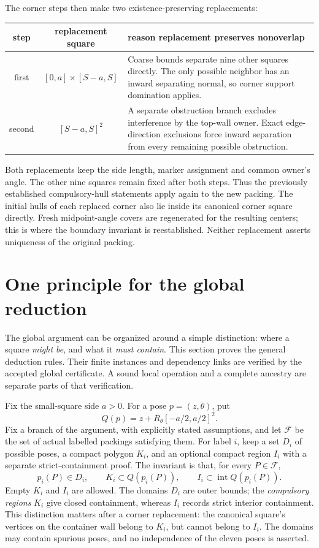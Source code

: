 \documentclass[11pt]{article}
\begin{document}
The corner steps then make two existence-preserving replacements:
\begin{center}
\begin{tabular}{c|c|p{.49\linewidth}}
step&replacement square&reason replacement preserves nonoverlap\\ \hline
first&$[0,a]\times[S-a,S]$&
Coarse bounds separate nine other squares directly. The only possible
neighbor has an inward separating normal, so corner support domination
applies.\\
second&$[S-a,S]^2$&
A separate obstruction branch excludes interference by the top-wall
owner. Exact edge-direction exclusions force inward separation from
every remaining possible obstruction.
\end{tabular}
\end{center}
Both replacements keep the side length, marker assignment and common
owner's angle. The other nine squares remain fixed after both steps.
Thus the previously established compulsory-hull statements apply again
to the new packing. The initial hulls of each replaced corner also lie
inside its canonical corner square directly. Fresh midpoint-angle covers
are regenerated for the resulting centers; this is where the boundary
invariant is reestablished. Neither replacement asserts uniqueness of the
original packing.


\section{One principle for the global reduction}
\label{sec:global-envelope}

The global argument can be organized around a simple distinction: where a
square \emph{might be}, and what it \emph{must contain}.  This section proves
the general deduction rules. Their finite instances and dependency links
are verified by the accepted global certificate. A sound local operation
and a complete ancestry are separate parts of that verification.

Fix the small-square side $a>0$.  For a pose $p=(z,\theta)$, put
\[
 Q(p)=z+R_\theta[-a/2,a/2]^2.
\]
Fix a branch of the argument, with explicitly stated assumptions, and let
$\mathcal F$ be the set of actual labelled packings satisfying them.
For label $i$, keep a set $D_i$ of possible poses, a compact polygon $K_i$,
and an optional compact region $I_i$ with a separate strict-containment proof.
The invariant is that, for every $P\in\mathcal F$,
\begin{equation}
 p_i(P)\in D_i,
 \qquad K_i\subset Q(p_i(P)),
 \qquad I_i\subset\operatorname{int}Q(p_i(P)).
 \tag{G}\label{eq:global-invariant}
\end{equation}
Empty $K_i$ and $I_i$ are allowed.  The domains $D_i$ are outer bounds;
the \emph{compulsory regions} $K_i$ give closed containment, whereas $I_i$
records strict interior containment.  This distinction matters after a
corner replacement: the canonical square's vertices on the container wall
belong to $K_i$, but cannot belong to $I_i$.
The domains may contain spurious poses, and no independence of the
eleven poses is asserted.
\end{document}

